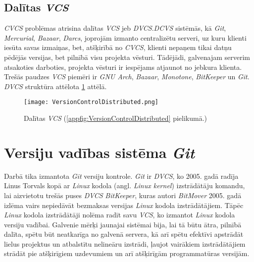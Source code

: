 \subsection{Dalītas \textit{VCS}}
\textit{CVCS} problēmas atrisina dalītas \textit{VCS} jeb \textit{DVCS}.\textit{DCVS} sistēmās, kā \textit{Git}, \textit{Mercurial}, \textit{Bazaar}, \textit{Darcs}, joprojām izmanto centralizētu serveri, uz kuru klienti iesūta savas izmaiņas, bet, atšķirībā no \textit{CVCS}, klienti nepaņem tikai datņu pēdējās versijas, bet pilnībā visu projekta vēsturi. Tādējādi, galvenajam serverim atsakoties darboties, projekta vēsturi ir iespējams atjaunot no jebkura klienta. Trešās paudzes \textit{VCS} piemēri ir \textit{GNU Arch}, \textit{Bazaar}, \textit{Monotone}, \textit{BitKeeper} un \textit{Git}. \textit{DVCS} struktūra attēlota \ref{fig:VersionControlDistributed} attēlā. \cite{chacon2014progit}
\begin{figure}[H]%
	\centering
	\captionsetup{justification=centering}
	\texttt{[image: VersionControlDistributed.png]}
	\caption{Dalītas \textit{VCS} (\ref{appfig:VersionControlDistributed} pielikumā.)}
	\label{fig:VersionControlDistributed}
\end{figure}

\section{Versiju vadības sistēma \textit{Git}}
Darbā tika izmantota \textit{Git} versiju kontrole. %
\textit{Git} ir \textit{DVCS}, ko 2005. gadā radīja Linus Torvals kopā ar \textit{Linux} kodola (angl. \textit{Linux kernel}) izstrādātāju komandu, lai aizvietotu trešās puses \textit{DVCS}  \textit{BitKeeper}, kuras autori \textit{BitMover} 2005. gadā izlēma vairs nepiedāvāt bezmaksas versijas  \textit{Linux} kodola izstrādātājiem. Tāpēc \textit{Linux} kodola izstrādātāji nolēma radīt savu \textit{VCS}, ko izmantot \textit{Linux} kodola versiju vadībai. Galvenie mērķi jaunajai sistēmai bija, lai tā būtu ātra, pilnībā dalīta, spētu būt neatkarīga no galvenā servera, kā arī spētu efektīvi apstrādāt lielus projektus un atbalstītu nelineāru izstrādi, ļaujot vairākiem izstrādātājiem strādāt pie atšķirīgiem uzdevumiem un arī atšķirīgām programmatūras versijām.

